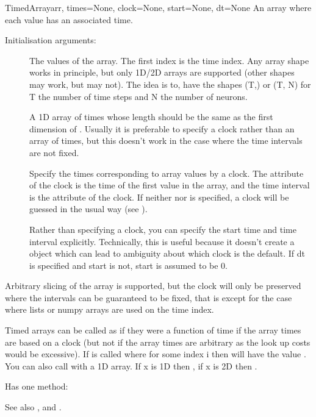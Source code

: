 \documentclass[letterpaper,10pt,english]{manual}
\begin{document}
\hypertarget{brian.TimedArray}{}\begin{classdesc}{TimedArray}{arr, times=None, clock=None, start=None, dt=None}
An array where each value has an associated time.

Initialisation arguments:
\begin{description}
\item[]
The values of the array. The first index is the time index. Any
array shape works in principle, but only 1D/2D arrays are
supported (other shapes may work, but may not). The idea is to,
have the shapes (T,) or (T, N) for T the number of time steps and
N the number of neurons.

\item[]
A 1D array of times whose length should be the same as the first
dimension of . Usually it is preferable to specify a
clock rather than an array of times, but this doesn't work in
the case where the time intervals are not fixed.

\item[]
Specify the times corresponding to array values by a clock. The
 attribute of the clock is the time of the first value
in the array, and the time interval is the  attribute of
the clock. If neither  nor  is specified, a
clock will be guessed in the usual way (see \hyperlink{brian.Clock}{}).

\item[]
Rather than specifying a clock, you can specify the start time
and time interval explicitly. Technically, this is useful
because it doesn't create a \hyperlink{brian.Clock}{} object which can
lead to ambiguity about which clock is the default. If dt is
specified and start is not, start is assumed to be 0.

\end{description}

Arbitrary slicing of the array is supported, but the clock will only
be preserved where the intervals can be guaranteed to be fixed, that
is except for the case where lists or numpy arrays are used on the
time index.

Timed arrays can be called as if they were a function of time if the
array times are based on a clock (but not if the array times are
arbitrary as the look up costs would be excessive). If  is called
where  for some index i then  will
have the value . You can also call  with  a 1D array.
If x is 1D then , if x is 2D then .

Has one method:

See also \hyperlink{brian.TimedArraySetter}{}, \hyperlink{brian.set_group_var_by_array}{} and
\hyperlink{brian.NeuronGroup}{}.
\end{classdesc}
\end{document}
